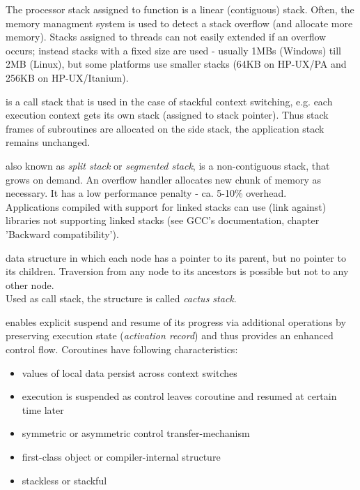 The processor stack assigned to function \main is a linear (contiguous) stack.
Often, the memory managment system is used to detect a stack overflow (and
allocate more memory). Stacks assigned to threads can not easily extended if
an overflow occurs; instead stacks with a fixed size are used - usually 1MBs
(Windows) till 2MB (Linux), but some platforms use smaller stacks (64KB on
HP-UX/PA and 256KB on HP-UX/Itanium).

is a call stack that is used in the case of stackful context switching, e.g.
each execution context gets its own stack (assigned to stack pointer). Thus
stack frames of subroutines are allocated on the side stack, the application
stack remains unchanged.

also known as \emph{split stack}\cite{gccsplit} or
\emph{segmented stack}\cite{llvmseg}, is a non-contiguous stack, that grows on
demand. An overflow handler allocates new chunk of memory as necessary. It has a
low performance penalty - ca. 5-10\% overhead.\\
Applications compiled with support for linked stacks can use (link against)
libraries not supporting linked stacks (see GCC's documentation\cite{gccsplit},
chapter 'Backward compatibility').

data structure in which each node has a pointer to its parent, but no pointer to
its children. Traversion from any node to its ancestors is possible but not to
any other node.\\
Used as call stack, the structure is called \emph{cactus stack}.

enables explicit suspend and resume of its progress via additional operations by
preserving execution state (\emph{activation record}) and thus provides an
enhanced control flow. Coroutines have following characteristics\cite{N3985}:
\begin{itemize}
    \item values of local data persist across context switches
    \item execution is suspended as control leaves coroutine and resumed at
          certain time later
    \item symmetric or asymmetric control transfer-mechanism
    \item first-class object or compiler-internal structure
    \item stackless or stackful
\end{itemize}


